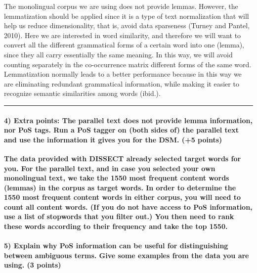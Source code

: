\documentclass[11pt]{article}
\begin{document}
The monolingual corpus we are using does not provide lemmas. However,
the lemmatization should be applied since it is a type of text
normalization that will help us reduce dimensionality, that is, avoid
data sparseness (Turney and Pantel, 2010). Here we are interested in
word similarity, and therefore we will want to convert all the different
grammatical forms of a certain word into one (lemma), since they all
carry essentially the same meaning. In this way, we will avoid counting
separately in the co-occurrence matrix different forms of the same word.
Lemmatization normally leads to a better performance because in this way
we are eliminating redundant grammatical information, while making it
easier to recognize semantic similarities among words (ibid.).

    \begin{center}\rule{0.5\linewidth}{\linethickness}\end{center}

\hypertarget{extra-points-the-parallel-text-does-not-provide-lemma-information-nor-pos-tags.-run-a-pos-tagger-on-both-sides-of-the-parallel-text-and-use-the-information-it-gives-you-for-the-dsm.-5-points}{%
\paragraph{4) Extra points: The parallel text does not provide lemma
information, nor PoS tags. Run a PoS tagger on (both sides of) the
parallel text and use the information it gives you for the DSM. (+5
points)}\label{extra-points-the-parallel-text-does-not-provide-lemma-information-nor-pos-tags.-run-a-pos-tagger-on-both-sides-of-the-parallel-text-and-use-the-information-it-gives-you-for-the-dsm.-5-points}}

    \textbf{The data provided with DISSECT already selected target words for
you. For the parallel text, and in case you selected your own
monolingual text, we take the 1550 most frequent content words (lemmas)
in the corpus as target words. In order to determine the 1550 most
frequent content words in either corpus, you will need to count all
content words. (If you do not have access to PoS information, use a list
of stopwords that you filter out.) You then need to rank these words
according to their frequency and take the top 1550.}

    \hypertarget{explain-why-pos-information-can-be-useful-for-distinguishing-between-ambiguous-terms.-give-some-examples-from-the-data-you-are-using.-3-points}{%
\paragraph{5) Explain why PoS information can be useful for
distinguishing between ambiguous terms. Give some examples from the data
you are using. (3
points)}\label{explain-why-pos-information-can-be-useful-for-distinguishing-between-ambiguous-terms.-give-some-examples-from-the-data-you-are-using.-3-points}}
\end{document}
